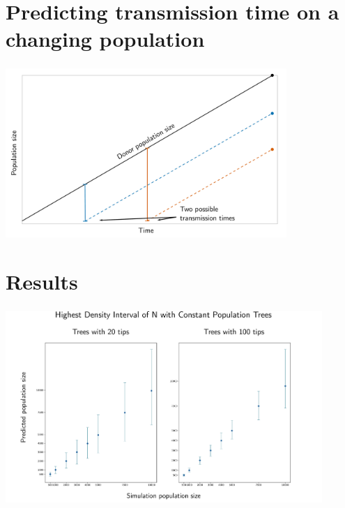 \documentclass[aspectratio=169]{beamer}
\begin{document}
\section{Predicting transmission time on a changing population}

\begin{frame} \frametitle{\insertsection}

    \centering\includegraphics[width=0.8\textwidth]{images/linear-time-location}

\end{frame}

\section{Results}

\begin{frame} \frametitle{\insertsection}

    \centering\includegraphics[width=0.9\textwidth]{images/constant-agreement}

\end{frame}
\end{document}
